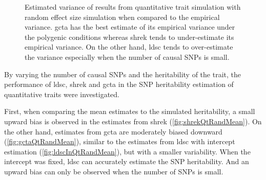 \begin{figure}
{					
					\label{fig:ldscInQtRandVarCom}
				}
				\caption[Estimation of Variance in Quantitative Trait Simulation]
				{Estimated variance of results from quantitative trait simulation with random effect size simulation when compared to the empirical variance.
					\gls{gcta} has the best estimate of its empirical variance under the polygenic conditions whereas \gls{shrek} tends to under-estimate its empirical variance.
					On the other hand, \gls{ldsc} tends to over-estimate the variance especially when the number of causal \glspl{SNP} is small.
				} 
				\label{fig:QtRandVarCom}
			\end{figure}
			
		By varying the number of causal \glspl{SNP} and the heritability of the trait, the performance of \gls{ldsc}, \gls{shrek} and \gls{gcta} in the \gls{SNP} heritability estimation of quantitative traits were investigated.
		
		First, when comparing the mean estimates to the simulated heritability, a small upward bias is observed in the estimates from \gls{shrek} (\cref{fig:shrekQtRandMean}).
		On the other hand, estimates from \gls{gcta} are moderately biased downward (\cref{fig:gctaQtRandMean}), similar to the estimates from \gls{ldsc} with intercept estimation (\cref{fig:ldscInQtRandMean}), but with a smaller variability.
		When the intercept was fixed, \gls{ldsc} can accurately estimate the \gls{SNP} heritability.
		And an upward bias can only be observed when the number of \glspl{SNP} is small.
		
